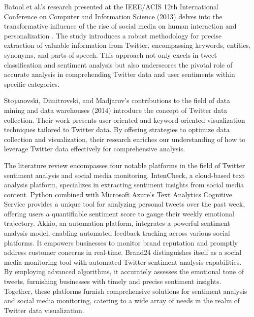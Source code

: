 \documentclass[a4paper,12pt]{article}
\begin{document}
{{{Batool et al.'s research presented at the IEEE/ACIS 12th International Conference on Computer and Information Science (2013) delves into the transformative influence of the rise of social media on human interaction and personalization \cite{batool2013precise}. The study introduces a robust methodology for precise extraction of valuable information from Twitter, encompassing keywords, entities, synonyms, and parts of speech. This approach not only excels in tweet classification and sentiment analysis but also underscores the pivotal role of accurate analysis in comprehending Twitter data and user sentiments within specific categories.

Stojanovski, Dimitrovski, and Madjarov's contributions to the field of data mining and data warehouses (2014)\cite{stojanovski2014tweetviz} introduce the concept of Twitter data collection. Their work presents user-oriented and keyword-oriented visualization techniques tailored to Twitter data. By offering strategies to optimize data collection and visualization, their research enriches our understanding of how to leverage Twitter data effectively for comprehensive analysis.


The literature review encompasses four notable platforms in the field of Twitter sentiment analysis and social media monitoring. IntenCheck, a cloud-based text analysis platform, specializes in extracting sentiment insights from social media content. Python combined with Microsoft Azure’s Text Analytics Cognitive Service provides a unique tool for analyzing personal tweets over the past week, offering users a quantifiable sentiment score to gauge their weekly emotional trajectory. Akkio, an automation platform, integrates a powerful sentiment analysis model, enabling automated feedback tracking across various social platforms. It empowers businesses to monitor brand reputation and promptly address customer concerns in real-time. Brand24 distinguishes itself as a social media monitoring tool with automated Twitter sentiment analysis capabilities. By employing advanced algorithms, it accurately assesses the emotional tone of tweets, furnishing businesses with timely and precise sentiment insights. Together, these platforms furnish comprehensive solutions for sentiment analysis and social media monitoring, catering to a wide array of needs in the realm of Twitter data visualization.

}}}
\end{document}
